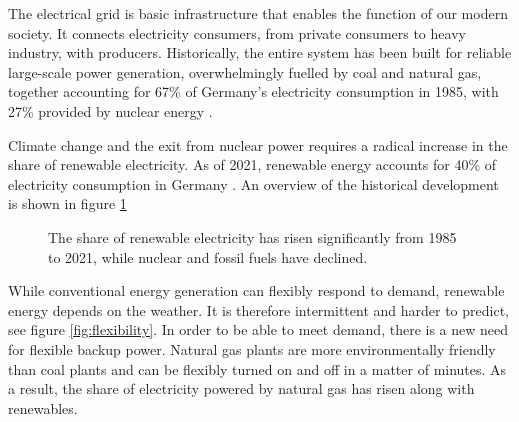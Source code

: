 The electrical grid is basic infrastructure that enables the function of our modern society.
It connects electricity consumers, from private consumers to heavy industry, with producers.
Historically, the entire system has been built for reliable large-scale power generation, overwhelmingly fuelled by coal and natural gas, together accounting for 67\% of Germany's electricity consumption in 1985, with 27\% provided by nuclear energy \cite{ritchie2022Energy}.

Climate change and the exit from nuclear power requires a radical increase in the share of renewable electricity. As of 2021, renewable energy accounts for 40\% of electricity consumption in Germany \cite{ritchie2022Energy}.
An overview of the historical development is shown in figure \ref{fig:electricity_mix}

\begin{figure}
    \caption{The share of renewable electricity has risen significantly from 1985 to 2021, while nuclear and fossil fuels have declined.}
    \label{fig:electricity_mix}
\end{figure}

While conventional energy generation can flexibly respond to demand, renewable energy depends on the weather.
It is therefore intermittent and harder to predict, see figure \ref{fig:flexibility}. In order to be able to meet demand, there is a new need for flexible backup power.
Natural gas plants are more environmentally friendly than coal plants and can be flexibly turned on and off in a matter of minutes.
As a result, the share of electricity powered by natural gas has risen along with renewables.

